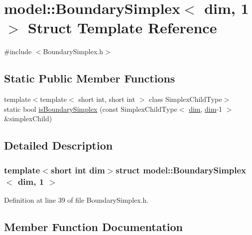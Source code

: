 \hypertarget{structmodel_1_1_boundary_simplex_3_01dim_00_011_01_4}{}\section{model\+:\+:Boundary\+Simplex$<$ dim, 1 $>$ Struct Template Reference}
\label{structmodel_1_1_boundary_simplex_3_01dim_00_011_01_4}


{\ttfamily \#include $<$Boundary\+Simplex.\+h$>$}

\subsection*{Static Public Member Functions}
\begin{DoxyCompactItemize}
\item 
{\footnotesize template$<$template$<$ short int, short int $>$ class Simplex\+Child\+Type$>$ }\\static bool \hyperlink{structmodel_1_1_boundary_simplex_3_01dim_00_011_01_4_adead354f04581426e722ba97d3320902}{is\+Boundary\+Simplex} (const Simplex\+Child\+Type$<$ \hyperlink{plot_nd_a_8m_a382f3ca768b275b8d563604f7fc7df73}{dim}, \hyperlink{plot_nd_a_8m_a382f3ca768b275b8d563604f7fc7df73}{dim}-\/1 $>$ \&simplex\+Child)
\end{DoxyCompactItemize}


\subsection{Detailed Description}
\subsubsection*{template$<$short int dim$>$struct model\+::\+Boundary\+Simplex$<$ dim, 1 $>$}



Definition at line 39 of file Boundary\+Simplex.\+h.



\subsection{Member Function Documentation}
\hypertarget{structmodel_1_1_boundary_simplex_3_01dim_00_011_01_4_adead354f04581426e722ba97d3320902}{}
